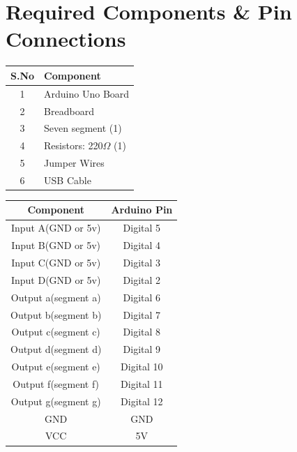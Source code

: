 \documentclass[a4paper,12pt]{article}
\begin{document}
\section*{Required Components \& Pin Connections}
\begin{center}
\begin{minipage}{0.45\textwidth}
\begin{table}[H]
\centering
\begin{tabular}{|c|l|}
\hline
\textbf{S.No} & \textbf{Component} \\ \hline
1 & Arduino Uno Board \\
2 & Breadboard \\
3 & Seven segment (1) \\
4 & Resistors: 220$\Omega$ (1) \\
5 & Jumper Wires \\
6 & USB Cable \\
\hline
\end{tabular}
\end{table}
\end{minipage}
\hspace{0.05\textwidth}
\begin{minipage}{0.45\textwidth}
\begin{table}[H]
\centering
\begin{tabular}{|c|c|}
\hline
\textbf{Component} & \textbf{Arduino Pin} \\ \hline
Input A(GND or 5v) & Digital 5 \\
Input B(GND or 5v) & Digital 4 \\
Input C(GND or 5v) & Digital 3 \\
Input D(GND or 5v) & Digital 2 \\
Output a(segment a) & Digital 6 \\
Output b(segment b) & Digital 7 \\
Output c(segment c) & Digital 8 \\
Output d(segment d) & Digital 9 \\
Output e(segment e) & Digital 10 \\
Output f(segment f) & Digital 11 \\
Output g(segment g) & Digital 12 \\
GND & GND \\
VCC & 5V \\
\hline
\end{tabular}
\end{table}
\end{minipage}
\end{center}
\end{document}
